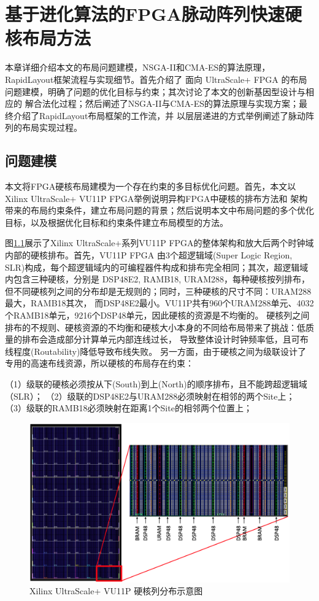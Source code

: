\chapter{基于进化算法的FPGA脉动阵列快速硬核布局方法}

本章详细介绍本文的布局问题建模，NSGA-II和CMA-ES的算法原理，RapidLayout框架流程与实现细节。首先介绍了
面向 UltraScale+ FPGA 的布局问题建模，明确了问题的优化目标与约束；其次讨论了本文的创新基因型设计与相应的
解合法化过程；然后阐述了NSGA-II与CMA-ES的算法原理与实现方案；最终介绍了RapidLayout布局框架的工作流，并
以层层递进的方式举例阐述了脉动阵列的布局实现过程。

\vspace{-0.3in}

\section{问题建模}

本文将FPGA硬核布局建模为一个存在约束的多目标优化问题。首先，本文以Xilinx UltraScale+ VU11P FPGA举例说明异构FPGA中硬核的排布方法和
架构带来的布局约束条件，建立布局问题的背景；然后说明本文中布局问题的多个优化目标，以及根据优化目标和约束条件建立布局模型的方法。

图\ref{fig:architecture}展示了Xilinx UltraScale+系列VU11P FPGA的整体架构和放大后两个时钟域内部的硬核排布。首先，VU11P FPGA
由3个超逻辑域(Super Logic Region, SLR)构成，每个超逻辑域内的可编程器件构成和排布完全相同；其次，超逻辑域内包含三种硬核，分别是
DSP48E2, RAMB18, URAM288，每种硬核按列排布，但不同硬核列之间的分布却是无规则的；同时，三种硬核的尺寸不同：URAM288最大，RAMB18其次，
而DSP48E2最小。VU11P共有960个URAM288单元、4032个RAMB18单元，9216个DSP48单元，因此硬核的资源是不均衡的。
硬核列之间排布的不规则、硬核资源的不均衡和硬核大小本身的不同给布局带来了挑战：低质量的排布会造成部分计算单元内部连线过长，
导致整体设计时钟频率低，且可布线程度(Routability)降低导致布线失败。
另一方面，由于硬核之间为级联设计了专用的高速布线资源，所以硬核的布局存在约束：

（1）级联的硬核必须按从下(South)到上(North)的顺序排布，且不能跨超逻辑域（SLR）；
（2）级联的DSP48E2与URAM288必须映射在相邻的两个Site上；
（3）级联的RAMB18必须映射在距离1个Site的相邻两个位置上；


\begin{figure}[h]
	\centering
	\includegraphics[width=\textwidth]{figure/architecture}
	\caption{Xilinx UltraScale+ VU11P 硬核列分布示意图} 
	\label{fig:architecture}
\end{figure}


